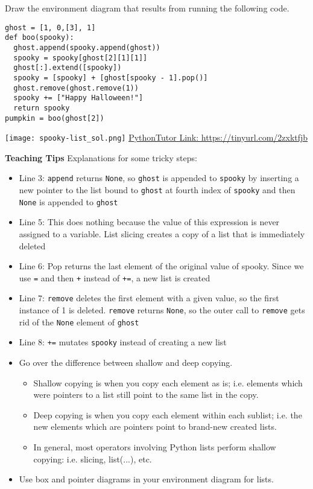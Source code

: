 \begin{blocksection}
\question Draw the environment diagram that results from running the following code.
\begin{lstlisting}
ghost = [1, 0,[3], 1]
def boo(spooky):
  ghost.append(spooky.append(ghost))
  spooky = spooky[ghost[2][1][1]]
  ghost[:].extend([spooky])
  spooky = [spooky] + [ghost[spooky - 1].pop()] 
  ghost.remove(ghost.remove(1))
  spooky += ["Happy Halloween!"]
  return spooky
pumpkin = boo(ghost[2])
\end{lstlisting}

\begin{solution}[1in]
  \texttt{[image: spooky-list\_sol.png]}
  \newline
  \href{https://tinyurl.com/2zxktfjb}{PythonTutor Link: https://tinyurl.com/2zxktfjb} 
\end{solution}
\begin{guide}
\textbf{Teaching Tips}
\newline
  Explanations for some tricky steps:
  \begin{itemize}
    \item Line 3: \lstinline{append} returns \lstinline{None}, so \lstinline{ghost} is appended to \lstinline{spooky} by inserting a new pointer to the list bound to \lstinline{ghost} at fourth index of \lstinline{spooky} and then \lstinline{None} is appended to \lstinline{ghost}
    \item Line 5: This does nothing because the value of this expression is never assigned to a variable. List slicing creates a copy of a list that is immediately deleted
    \item Line 6: Pop returns the last element of the original value of spooky. Since we use \lstinline{=} and then \lstinline{+} instead of \lstinline{+=}, a new list is created
    \item Line 7: \lstinline{remove} deletes the first element with a given value, so the first instance of 1 is deleted. \lstinline{remove} returns \lstinline{None}, so the outer call to \lstinline{remove} gets rid of the \lstinline{None} element of \lstinline{ghost}
    \item Line 8: \lstinline{+=} mutates \lstinline{spooky} instead of creating a new list 
    \item Go over the difference between shallow and deep copying.
    \begin{itemize}
			\item Shallow copying is when you copy each element as is; i.e. elements which were pointers to a list still point to the same list in the copy.
			\item Deep copying is when you copy each element within each sublist; i.e. the new elements which are pointers point to brand-new created lists.
			\item In general, most operators involving Python lists perform shallow copying: i.e. slicing, list(...), etc. 
    \end{itemize}
    \item Use box and pointer diagrams in your environment diagram for lists.
  \end{itemize}
\end{guide}
\end{blocksection}